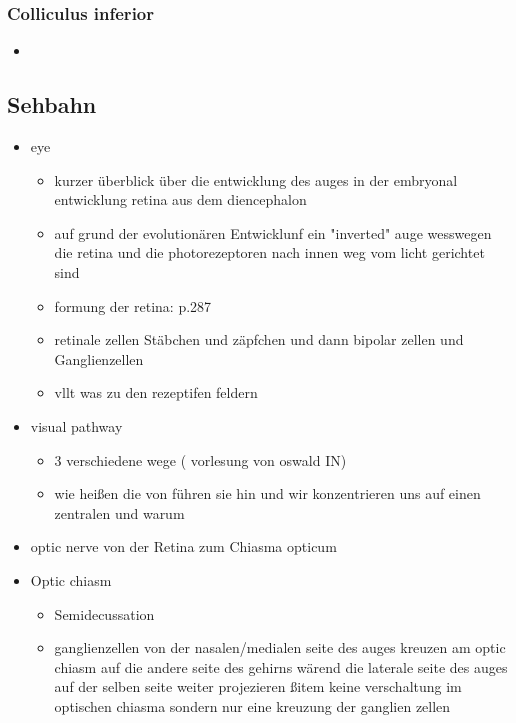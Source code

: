 \documentclass[12pt,a4paper,pdftex]{article}
\begin{document}
\subsubsection*{Colliculus inferior}

    \begin{itemize}
        \item 
    \end{itemize}


\newpage
\subsection{Sehbahn}
\begin{itemize}
    \item eye
    \begin{itemize}
        \item kurzer überblick über die entwicklung des auges in der embryonal entwicklung retina aus dem diencephalon
        \item auf grund der evolutionären Entwicklunf ein "inverted" auge wesswegen die retina und die photorezeptoren nach innen weg vom licht gerichtet sind
        \item formung der retina: \cite{smith2008biology} p.287
        \item retinale zellen Stäbchen und zäpfchen und dann bipolar zellen und Ganglienzellen 
        \item vllt was zu den rezeptifen feldern
    \end{itemize}
    \item visual pathway
    \begin{itemize}
        \item 3 verschiedene wege ( vorlesung von oswald IN)
        \item wie heißen die von führen sie hin und wir konzentrieren uns auf einen zentralen und warum
    \end{itemize}
    \item optic nerve von der Retina zum Chiasma opticum
    \item Optic chiasm    
    \begin{itemize}
        \item Semidecussation  
        \item ganglienzellen von der nasalen/medialen seite des auges kreuzen am optic chiasm auf die andere seite des gehirns wärend die laterale seite des auges auf der selben seite weiter projezieren
        ßitem keine verschaltung im optischen chiasma sondern nur eine kreuzung der ganglien zellen

\end{itemize}
\end{itemize}
\end{document}
